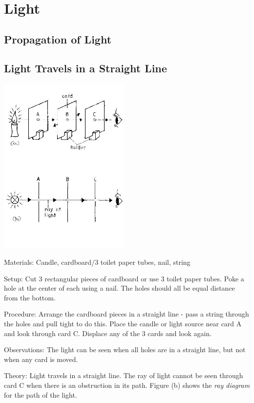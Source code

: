 \section{Light}

\begin{multicols}{2}


\section*{Propagation of Light}


\subsection{Light Travels in a Straight Line}

\begin{center}
\includegraphics[width=0.49\textwidth]{./img/source/prop-of-light-2.jpg}
\end{center}

\begin{description*}
\item[Materials:]{Candle, cardboard/3 toilet paper tubes, nail, string}
\item[Setup:]{Cut 3 rectangular pieces of cardboard or use 3 toilet paper tubes. Poke a hole at the center of each using a nail. The holes should all be equal distance from the bottom.}
\item[Procedure:]{Arrange the cardboard pieces in a straight line - pass a string through the holes and pull tight to do this. Place the candle or light source near card A and look through card C. Displace any of the 3 cards and look again.}
\item[Observations:]{The light can be seen when all holes are in a straight line, but not when any card is moved.}
\item[Theory:]{Light travels in a straight line. The ray of light cannot be seen through card C when there is an obstruction in its path. Figure (b) shows the \emph{ray diagram} for the path of the light.}
\end{description*}


\end{multicols}
